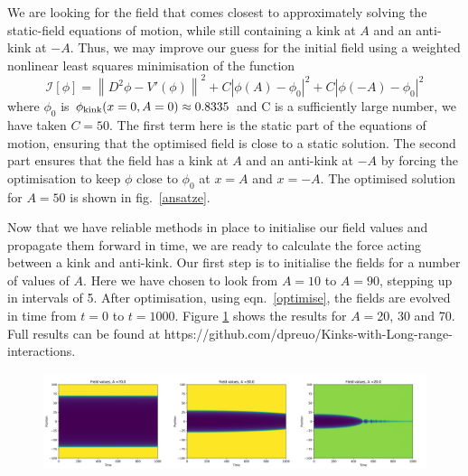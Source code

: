 \documentclass[11pt, oneside,titlepage]{article}  	%
\numberwithin{equation}{section}
\begin{document}
 We are looking for the field that comes closest to approximately solving the static-field equations of motion, while still containing a kink at $A$ and an anti-kink at $-A$. Thus, we may improve our guess for the initial field using a weighted nonlinear least squares minimisation of the function
 \begin{equation}\label{optimise}
 \mathcal{I}[\phi] = \left \| D^2\phi -V'\left( \phi \right) \right \|^2 + C\left | \phi(A) - \phi_0 \right |^2 + C\left | \phi(-A) - \phi_0 \right |^2
 \end{equation}
 where $\phi_0$ is $\phi_{\textup{kink}}(x=0,A=0) \approx 0.8335$ and C is a sufficiently large number, we have taken $C = 50$. The first term here is the static part of the equations of motion, ensuring that the optimised field is close to a static solution. The second part ensures that the field has a kink at $A$ and an anti-kink at $-A$ by forcing the optimisation to keep $\phi$ close to $\phi_0$ at $x=A$ and $x=-A$. The optimised solution for $A=50$ is shown in fig.~\ref{ansatze}.\par
 Now that we have reliable methods in place to initialise our field values and propagate them forward in time, we are ready to calculate the force acting between a kink and anti-kink. Our first step is to initialise the fields for a number of values of $A$. Here we have chosen to look from $A=10$ to $A = 90$, stepping up in intervals of 5. After optimisation, using eqn.~\ref{optimise}, the fields are evolved in time from $t=0$ to $t=1000$. Figure \ref{field_evolutions} shows the results for $A =$20, 30 and 70. Full results can be found at https://github.com/dpreuo/Kinks-with-Long-range-interactions.\par
 \begin{figure}
\centering
\includegraphics[width=\textwidth]{field_values}
 \label{field_evolutions}
\end{figure}
\end{document}
